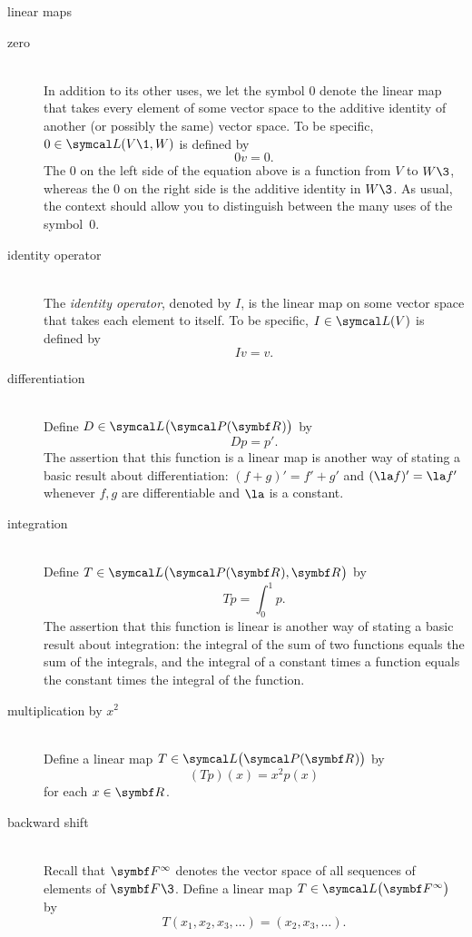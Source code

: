 \begin{example}[2a111]{linear maps}
\setlength{\leftmargini}{0bp}\begin{description}
\item[zero] \ \\
In addition to its other uses, we let the symbol $0$ denote the linear map that takes every element of some vector space to the additive identity of another (or possibly the same) vector space.  To be specific, $0 \in \L(V\1,W)$ is defined by
\[
0v = 0.
\]
The $0$ on the left side of the equation above is a function from
$V$ to $W\3$, whereas the $0$ on the right side is the additive identity in
$W\3$.  As usual, the context should allow you to distinguish between the many
uses of the symbol~$0$.

\item[identity operator] \ \\
The \emph{identity operator}, denoted by $I$, is the
linear map on some vector space that takes each element to itself.  To be specific,
$I \in \L(V)$ is defined by
\[
Iv = v.
\]

\pagebreak[2]

\item[differentiation] \ \\
Define $D\in \L\bigl(\P(\R{})\bigr)$ by
\[
Dp = p'\!.
\]
The assertion that this function is a linear map is another way of stating a basic
result about differentiation: $(f + g)' = f' + g'$ and $(\la f)' = \la f'$ whenever $f, g$
are differentiable and $\la$ is a constant.

\item[integration] \ \\
Define $T\in \L\bigl(\P(\R{}),\R{}\bigr)$ by
\[
Tp = \int_0^1 p.
\]
The assertion that this function is linear is another way of stating a basic
result about integration: the integral of the sum of two functions equals the
sum of the integrals, and the integral of a constant times a function equals the
constant times the integral of the function.

\item[multiplication by $x^2$]\ \\
Define a linear map $T\in \L\bigl(\P(\R{})\bigr)$ by
\[
(Tp)(x) = x^2 p(x)
\]
for each $x \in \R{}$.

\item[backward shift] \ \\
Recall that $\F{\infty}$ denotes the vector space of all sequences of elements of $\F{}\3$.  Define a linear map $T\in \L\paren[\big]{\F{\infty}}$ by
\[
T(x_1, x_2, x_3, \dots) = (x_2, x_3, \dots).
\]


\end{description}
\end{example}
